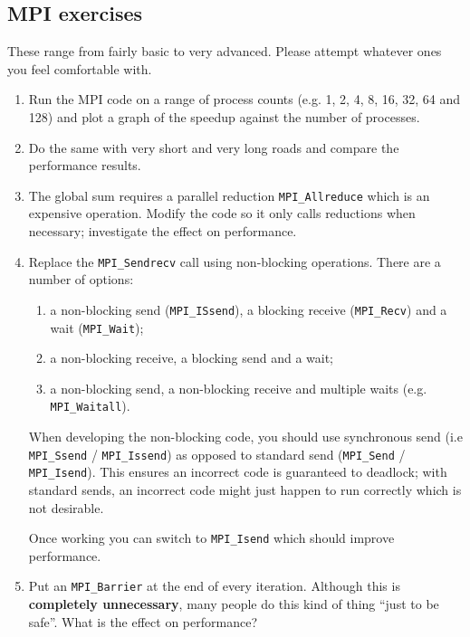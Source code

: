 \documentclass{article}
\begin{document}
\subsection{MPI exercises}

These range from fairly basic to very advanced. Please attempt
whatever ones you feel comfortable with.

\begin{enumerate}

\item Run the MPI code on a range of process counts (e.g. 1, 2, 4, 8,
  16, 32, 64 and 128) and plot a graph of the speedup against the
  number of processes.

\item Do the same with very short and very long roads and compare the
  performance results.

\item The global sum requires a parallel reduction
  \verb+MPI_Allreduce+ which is an expensive operation. Modify the
  code so it only calls reductions when necessary; investigate the
  effect on performance.

\item Replace the \texttt{MPI\_Sendrecv} call using non-blocking
  operations. There are a number of options:

\begin{enumerate}

\item a non-blocking send (\verb+MPI_ISsend+), a blocking receive
  (\verb+MPI_Recv+) and a wait (\verb+MPI_Wait+);

\item a non-blocking receive, a blocking send and a wait;

\item a non-blocking send, a non-blocking receive and multiple waits
  (e.g. \verb+MPI_Waitall+).

\end{enumerate}

When developing the non-blocking code, you should use synchronous send
(i.e \verb+MPI_Ssend+ / \verb+MPI_Issend+) as opposed to standard send
(\verb+MPI_Send+ / \verb+MPI_Isend+). This ensures an incorrect code is
guaranteed to deadlock; with standard sends, an incorrect code might
just happen to run correctly which is not desirable.

Once working you
can switch to \verb+MPI_Isend+ which should improve performance.

\item Put an \verb+MPI_Barrier+ at the end of every
  iteration. Although this is {\bf completely unnecessary}, many
  people do this kind of thing ``just to be safe''. What is the effect
  on performance?


\end{enumerate}
\end{document}
